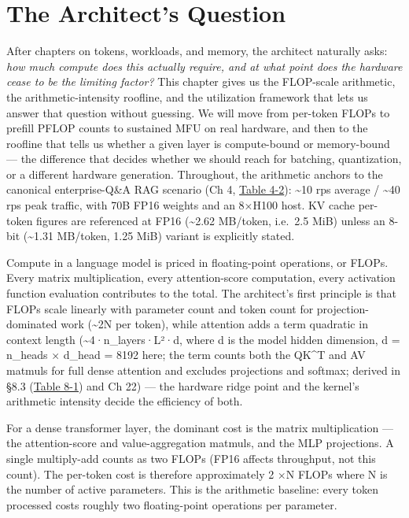 \section*{The Architect's Question}\label{the-architects-question}

After chapters on tokens, workloads, and memory, the architect naturally
asks: \emph{how much compute does this actually require, and at what
point does the hardware cease to be the limiting factor?} This chapter
gives us the FLOP-scale arithmetic, the arithmetic-intensity roofline,
and the utilization framework that lets us answer that question without
guessing. We will move from per-token FLOPs to prefill PFLOP counts to
sustained MFU on real hardware, and then to the roofline that tells us
whether a given layer is compute-bound or memory-bound --- the
difference that decides whether we should reach for batching,
quantization, or a different hardware generation. Throughout, the
arithmetic anchors to the canonical enterprise-Q\&A RAG scenario (Ch 4,
\hyperref[tab:4.2]{Table 4-2}): \textasciitilde10 rps average / \textasciitilde40 rps peak
traffic, with 70B FP16 weights and an 8×H100 host. KV cache per-token
figures are referenced at FP16 (\textasciitilde2.62 MB/token, i.e.~2.5
MiB) unless an 8-bit (\textasciitilde1.31 MB/token, 1.25 MiB) variant is
explicitly stated.

\label{concept}


Compute in a language model is priced in floating-point operations, or
FLOPs. Every matrix multiplication, every attention-score computation,
every activation function evaluation contributes to the total. The
architect's first principle is that FLOPs scale linearly with parameter
count and token count for projection-dominated work (\textasciitilde2N
per token), while attention adds a term quadratic in context length
(\textasciitilde4·n\_layers·L²·d, where d is the model hidden dimension,
d = n\_heads × d\_head = 8192 here; the term counts both the QK\^{}T and
AV matmuls for full dense attention and excludes projections and
softmax; derived in §8.3 (\hyperref[tab:8.1]{Table 8-1}) and Ch 22) --- the hardware ridge
point and the kernel's arithmetic intensity decide the efficiency of
both.

For a dense transformer layer, the dominant cost is the matrix
multiplication --- the attention-score and value-aggregation matmuls,
and the MLP projections. A single multiply-add counts as two FLOPs (FP16
affects throughput, not this count). The per-token cost is therefore
approximately 2 ×N FLOPs where N is the number of active parameters.
This is the arithmetic baseline: every token processed costs roughly two
floating-point operations per parameter.

